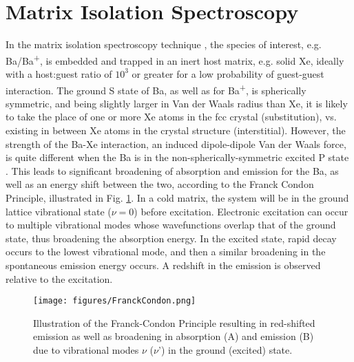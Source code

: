 \section{Matrix Isolation Spectroscopy}


In the matrix isolation spectroscopy technique \cite{matrixIso}, the species of interest, e.g. Ba/Ba\textsuperscript{+}, is embedded and trapped in an inert host matrix, e.g. solid Xe, ideally with a host:guest ratio of $10^{3}$ or greater for a low probability of guest-guest interaction.  The ground S state of Ba, as well as for Ba\textsuperscript{+}, is spherically symmetric, and being slightly larger in Van der Waals radius than Xe, it is likely to take the place of one or more Xe atoms in the fcc crystal (substitution), vs. existing in between Xe atoms in the crystal structure (interstitial).  However, the strength of the Ba-Xe interaction, an induced dipole-dipole Van der Waals force, is quite different when the Ba is in the non-spherically-symmetric excited P state \cite{crepin}.  This leads to significant broadening of absorption and emission for the Ba, as well as an energy shift between the two, according to the Franck Condon Principle, illustrated in Fig. \ref{fig:FranckCondon}.  In a cold matrix, the system will be in the ground lattice vibrational state ($\nu =0$) before excitation.  Electronic excitation can occur to multiple vibrational modes whose wavefunctions overlap that of the ground state, thus broadening the absorption energy.  In the excited state, rapid decay occurs to the lowest vibrational mode, and then a similar broadening in the spontaneous emission energy occurs.  A redshift in the emission is observed relative to the excitation.


\begin{figure} %
        \centering
                \texttt{[image: figures/FranckCondon.png]}
                \caption{Illustration of the Franck-Condon Principle resulting in red-shifted emission as well as broadening in absorption (A) and emission (B) due to vibrational modes $\nu$ ($\nu$') in the ground (excited) state.}
\label{fig:FranckCondon}
\end{figure}


